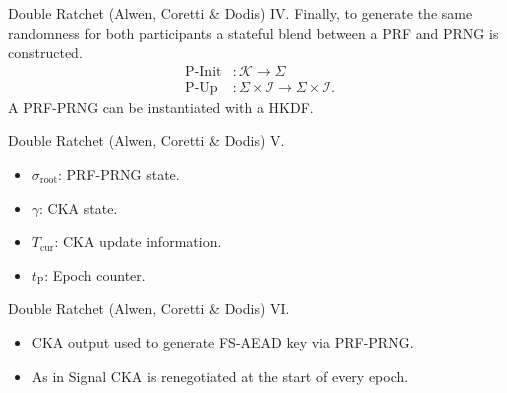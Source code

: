 \documentclass{beamer}
\renewcommand{\t}{\text}
\begin{document}
\begin{frame}{Double Ratchet (Alwen, Coretti \& Dodis) IV.}
  Finally, to generate the same randomness for both participants a stateful
  blend between a PRF and PRNG is constructed.
  \begin{align*}
    \t{P-Init} & : \mathcal{K} \rightarrow \Sigma \\
    \t{P-Up} & : \Sigma \times \mathcal{I} \rightarrow \Sigma \times \mathcal{I}.
  \end{align*}
  A PRF-PRNG can be instantiated with a HKDF.
\end{frame}

\begin{frame}{Double Ratchet (Alwen, Coretti \& Dodis) V.}
  \scriptsize
   \begin{minipage}[h]{0.49\textwidth}
      \begin{figure}[h]
        \centering
        \setlength{\fboxsep}{10pt}
        \scalebox{0.7}{%
        \fbox{%
          
        }
      }
    \end{figure}
    \end{minipage}
   \begin{minipage}[h]{0.49\textwidth}
      \begin{itemize}
      \item $\sigma_\t{root}$: PRF-PRNG state.
      \item $\gamma$: CKA state.
      \item $T_\t{cur}$: CKA update information.
      \item $t_\t{P}$: Epoch counter.
      \end{itemize}
  \end{minipage}
\end{frame}

\begin{frame}{Double Ratchet (Alwen, Coretti \& Dodis) VI.}
  \scriptsize
   \begin{minipage}[h]{0.49\textwidth}
      \begin{figure}[h]
        \centering
        \setlength{\fboxsep}{10pt}
        \scalebox{0.7}{%
        \fbox{%
          
        }
      }
    \end{figure}
    \end{minipage}
   \begin{minipage}[h]{0.49\textwidth}
      \begin{itemize}
      \item CKA output used to generate FS-AEAD key via PRF-PRNG.
      \item As in Signal CKA is renegotiated at the start of every epoch.
      \end{itemize}
  \end{minipage}
\end{frame}
\end{document}
